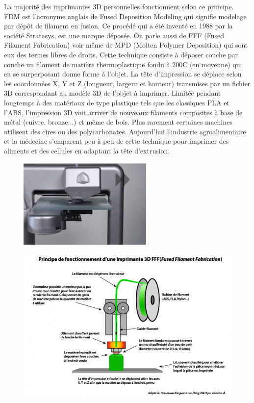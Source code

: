 \documentclass{article}
\begin{document}
La majorité des imprimantes 3D personnelles fonctionnent selon ce principe. FDM est l'acronyme anglais de Fused Deposition Modeling qui signifie modelage par dépôt de filament en fusion. Ce procédé qui a été inventé en 1988 par la société Stratasys, est une marque déposée. On parle aussi de FFF (Fused Filament Fabrication) voir même de MPD (Molten Polymer Deposition) qui sont eux des termes libres de droits. Cette technique consiste à déposer couche par couche un filament de matière thermoplastique fondu à 200\degres C (en moyenne) qui en se surperposant donne forme à l'objet. La tête d'impression se déplace selon les coordonnées X, Y et Z (longueur, largeur et hauteur) transmises par un fichier 3D correspondant au modèle 3D de l'objet à imprimer. Limitée pendant longtemps à des matériaux de type plastique tels que les classiques PLA et l'ABS, l'impression 3D voit arriver de nouveaux filaments composites à base de métal (cuivre, bronze...) et même de bois. Plus rarement certaines machines utilisent des cires ou des polycarbonates. Aujourd'hui l'industrie agroalimentaire et la médecine s'emparent peu à peu de cette technique pour imprimer des aliments et des cellules en adaptant la tête d'extrusion.
\begin{figure}[h!]
\centering
\includegraphics[scale=0.8]{./images/fdm.png}
\end{figure}
\begin{figure}[h!]
\centering
\includegraphics[scale=0.55]{./images/fonctionnement-imprimante-3d.png}
\end{figure}
\newpage
\end{document}
